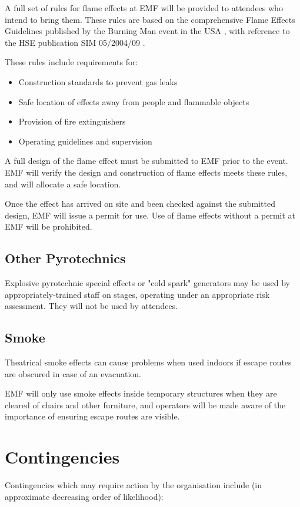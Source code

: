 A full set of rules for flame effects at EMF will be provided to attendees who
intend to bring them. These rules are based on the comprehensive
Flame Effects Guidelines published by the Burning Man event in the USA \cite{bmflame},
with reference to the HSE publication SIM 05/2004/09 \cite{lpgsim}.

These rules include requirements for:
\begin{itemize}
    \tightlist
    \item Construction standards to prevent gas leaks
    \item Safe location of effects away from people and flammable objects
    \item Provision of fire extinguishers
    \item Operating guidelines and supervision
\end{itemize}

A full design of the flame effect must be submitted to EMF prior to the
event. EMF will verify the design and construction of flame effects meets
these rules, and will allocate a safe location.

Once the effect has arrived on site and been checked against the submitted
design, EMF will issue a permit for use. Use of flame effects without a
permit at EMF will be prohibited.

\subsection{Other Pyrotechnics}
Explosive pyrotechnic special effects or "cold spark" generators may be used
by appropriately-trained staff on stages, operating under an appropriate risk
assessment. They will not be used by attendees.

\subsection{Smoke}
Theatrical smoke effects can cause problems when used indoors if escape
routes are obscured in case of an evacuation.

EMF will only use smoke effects inside temporary structures when they are
cleared of chairs and other furniture, and operators will be made aware of
the importance of ensuring escape routes are visible.

\newpage

\section{Contingencies}\label{contingencies}
Contingencies which may require action by the organisation include (in
approximate decreasing order of likelihood):

